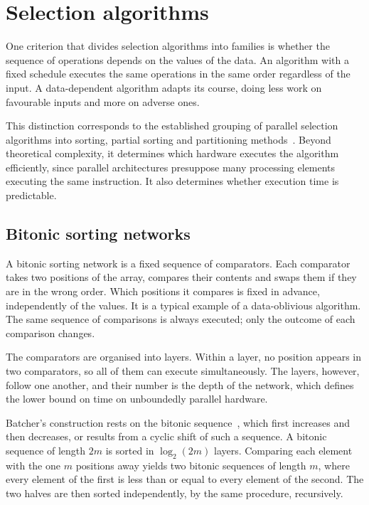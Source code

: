 \section{Selection algorithms}
\label{sec:bg-algorithms}

One criterion that divides selection algorithms into families is whether the
sequence of operations depends on the values of the data. An algorithm with a
fixed schedule executes the same operations in the same order regardless of the
input. A data-dependent algorithm adapts its course, doing less work on
favourable inputs and more on adverse ones.

This distinction corresponds to the established grouping of parallel selection
algorithms into sorting, partial sorting and partitioning
methods~\cite{zhang2023gputopk}. Beyond theoretical complexity, it determines
which hardware executes the algorithm efficiently, since parallel architectures
presuppose many processing elements executing the same instruction. It also
determines whether execution time is predictable.

\subsection{Bitonic sorting networks}
\label{sec:bg-bitonic}

A bitonic sorting network is a fixed sequence of comparators. Each comparator
takes two positions of the array, compares their contents and swaps them if
they are in the wrong order. Which positions it compares is fixed in advance,
independently of the values. It is a typical example of a data-oblivious
algorithm. The same sequence of comparisons is always executed; only the
outcome of each comparison changes.

The comparators are organised into layers. Within a layer, no position appears
in two comparators, so all of them can execute simultaneously. The layers,
however, follow one another, and their number is the depth of the network,
which defines the lower bound on time on unboundedly parallel hardware.

Batcher's construction rests on the bitonic sequence~\cite{batcher1968}, which
first increases and then decreases, or results from a cyclic shift of such a
sequence. A bitonic sequence of length $2m$ is sorted in $\log_2(2m)$ layers.
Comparing each element with the one $m$ positions away yields two bitonic
sequences of length $m$, where every element of the first is less than or equal
to every element of the second. The two halves are then sorted independently,
by the same procedure, recursively.

